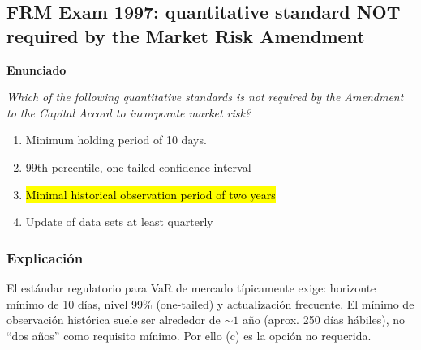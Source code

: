 ﻿\subsection{FRM Exam 1997: quantitative standard NOT required by the Market Risk Amendment}

\textbf{Enunciado}

\emph{Which of the following quantitative standards is not required by the Amendment to the Capital Accord to incorporate market risk?}
\begin{enumerate}[label=\alph*.]
\item Minimum holding period of 10 days.
\item 99th percentile, one tailed confidence interval
\item \hl{Minimal historical observation period of two years}
\item Update of data sets at least quarterly
\end{enumerate}

\subsubsection*{Explicación}


El estándar regulatorio para VaR de mercado típicamente exige: horizonte mínimo de 10 días, nivel 99\% (one-tailed) y actualización frecuente. El mínimo de observación histórica suele ser alrededor de \(\sim 1\) año (aprox. 250 días hábiles), no ``dos años'' como requisito mínimo. Por ello (c) es la opción no requerida.











